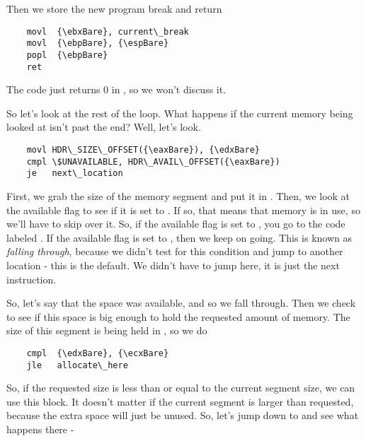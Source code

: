 Then we store the new program break and return

\begin{simpletyping}
\begin{lstlisting}
	movl  {\ebxBare}, current\_break
	movl  {\ebpBare}, {\espBare}
	popl  {\ebpBare}
	ret
\end{lstlisting}
\end{simpletyping}

The  code just returns 0 in \icode{{\eaxBare}}, so we won't 
discuss it.

So let's look at the rest of the loop.  What happens if the current memory being looked at isn't
past the end?  Well, let's look.

\begin{simpletyping}
\begin{lstlisting}
	movl HDR\_SIZE\_OFFSET({\eaxBare}), {\edxBare}
	cmpl \$UNAVAILABLE, HDR\_AVAIL\_OFFSET({\eaxBare})
	je   next\_location
\end{lstlisting}
\end{simpletyping}

First, we grab the size of the memory segment and put it in \icode{{\edxBare}}.
Then, we look at the available flag to see if it is set to .
If so, that means that memory is in use, so we'll have to skip over it.  So, if
the available flag is set to , you go to the code
labeled .  If the available flag is set to
, then we keep on going.  This is known as 
\emph{falling through}, because we didn't test for this condition and
jump to another location - this is the default.  We didn't have to jump here, it is
just the next instruction.  

So, let's say that the space was available, and so we fall through.  Then we check to
see if this space is big enough to hold the requested amount of memory.  The size of
this segment is being held in \icode{{\edxBare}}, so we do

\begin{simpletyping}
\begin{lstlisting}
	cmpl  {\edxBare}, {\ecxBare}
	jle   allocate\_here
\end{lstlisting}
\end{simpletyping}

So, if the requested size is less than or equal to the current segment size, we
can use this block.  It doesn't matter if the current segment is larger than requested,
because the extra space will just be unused.  So, let's jump down to 
 and see what happens there -


